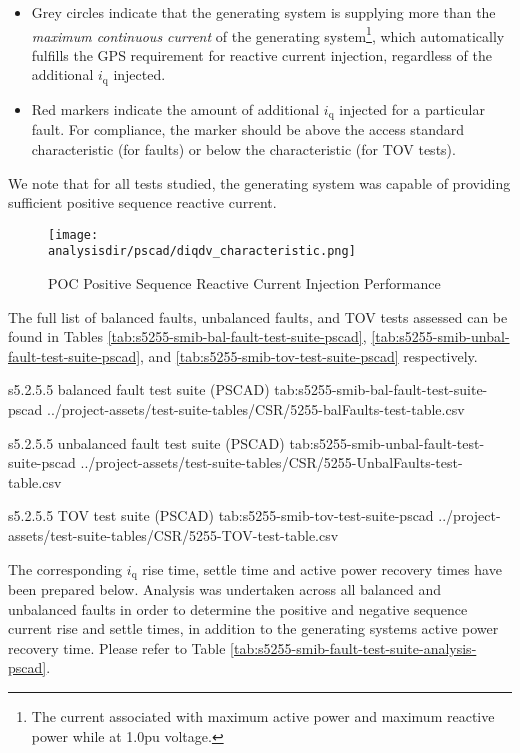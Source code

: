 \documentclass{../grid-link-report}
\newcommand{\projectassetsdir}{../project-assets}
\newcommand{\analysisdir}{report-assets/analysis}
\begin{document}
	\begin{itemize}
		\item Grey circles indicate that the generating system is supplying more than the \textit{maximum continuous current} of the generating system\footnote{The current associated with maximum active power and maximum reactive power while at 1.0pu voltage.}, which automatically fulfills the GPS requirement for reactive current injection, regardless of the additional $i_{\text{q}}$ injected.
		\item Red markers indicate the amount of additional $i_{\text{q}}$ injected for a particular fault. For compliance, the marker should be above the access standard characteristic (for faults) or below the characteristic (for \ac{TOV} tests).
	\end{itemize}
	
	We note that for all tests studied, the generating system was capable of providing sufficient positive sequence reactive current.
	\begin{figure}[H]
		\centering
		\texttt{[image: \\analysisdir/pscad/diqdv\_characteristic.png]}
		\caption{POC Positive Sequence Reactive Current Injection Performance}
		\label{fig:5255-pscad-pos-diqdv-poc}
	\end{figure}
	

	
	The full list of balanced faults, unbalanced faults, and TOV tests assessed can be found in Tables \ref{tab:s5255-smib-bal-fault-test-suite-pscad}, \ref{tab:s5255-smib-unbal-fault-test-suite-pscad}, and \ref{tab:s5255-smib-tov-test-suite-pscad} respectively.
	
	
	{
		\fontsize{6.5}{9}\selectfont
		\autoscaledlongtable
		{s5.2.5.5 balanced fault test suite (PSCAD)}
		{tab:s5255-smib-bal-fault-test-suite-pscad}
		{\projectassetsdir/test-suite-tables/CSR/5255-balFaults-test-table.csv}
	}
	
	{
		\fontsize{6.5}{9}\selectfont
		\autoscaledlongtable
		{s5.2.5.5 unbalanced fault test suite (PSCAD)}
		{tab:s5255-smib-unbal-fault-test-suite-pscad}
		{\projectassetsdir/test-suite-tables/CSR/5255-UnbalFaults-test-table.csv}
	}

	{
		\fontsize{7}{9}\selectfont
		\autoscaledlongtable
		{s5.2.5.5 TOV test suite (PSCAD)}
		{tab:s5255-smib-tov-test-suite-pscad}
		{\projectassetsdir/test-suite-tables/CSR/5255-TOV-test-table.csv}
	}

	The corresponding $i_{\text{q}}$ rise time, settle time and active power recovery times have been prepared below. Analysis was undertaken across all balanced and unbalanced faults in order to determine the positive and negative sequence current rise and settle times, in addition to the generating systems active power recovery time. Please refer to Table \ref{tab:s5255-smib-fault-test-suite-analysis-pscad}. 
	
\end{document}
